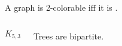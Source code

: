 \begin{frame}{}
  \begin{theorem}
    A graph is 2-colorable iff \pause it is .
  \end{theorem}

  \vspace{0.80cm}
  \begin{columns}
      \pause
      \[
        K_{5, 3}
      \]
      \pause
      \begin{center}
        Trees are bipartite.
      \end{center}
  \end{columns}
\end{frame}

%
%
%



